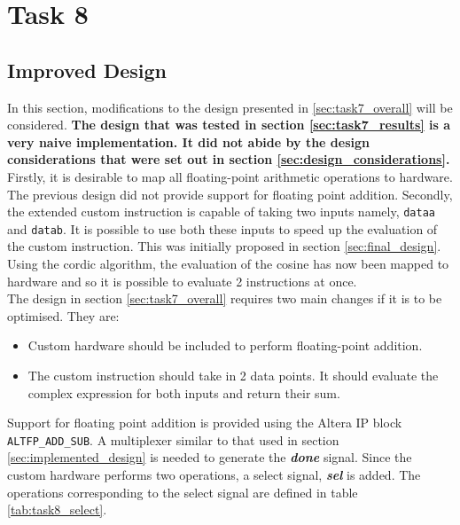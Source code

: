 \documentclass{article}
\begin{document}
\newpage
\section{Task 8}\label{sec:task8}

\subsection{Improved Design}

In this section, modifications to the design presented in \ref{sec:task7_overall} will be considered. \textbf{The design that was tested in section \ref{sec:task7_results} is a very naive implementation. It did not abide by the design considerations that were set out in section \ref{sec:design_considerations}.} Firstly, it is desirable to map all floating-point arithmetic operations to hardware. The previous design did not provide support for floating point addition. Secondly, the extended custom instruction is capable of taking two inputs namely, {\tt dataa} and {\tt datab}. It is possible to use both these inputs to speed up the evaluation of the custom instruction. This was initially proposed in section \ref{sec:final_design}. Using the cordic algorithm, the evaluation of the cosine has now been mapped to hardware and so it is possible to evaluate 2 instructions at once.\\

The design in section \ref{sec:task7_overall} requires two main changes if it is to be optimised. They are:
\begin{itemize}
    \item Custom hardware should be included to perform floating-point addition. 
    \item The custom instruction should take in 2 data points. It should evaluate the complex expression for both inputs and return their sum. 
\end{itemize}

Support for floating point addition is provided using the Altera IP block {\tt ALTFP\_ADD\_SUB}. A multiplexer similar to that used in section \ref{sec:implemented_design} is needed to generate the \textbf{\textit{done}} signal. Since the custom hardware performs two operations, a select signal, \textbf{\textit{sel}} is added. The operations corresponding to the select signal are defined in table \ref{tab:task8_select}.
\end{document}
